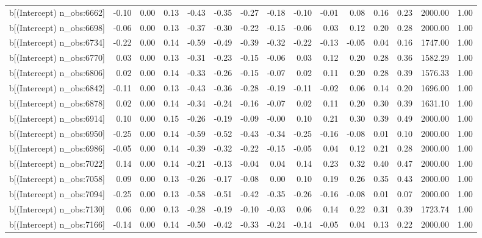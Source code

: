 \begin{table}[ht]
\begin{tabular}{rrrrrrrrrrrrrrr}
  b[(Intercept) n\_obs:6662] & -0.10 & 0.00 & 0.13 & -0.43 & -0.35 & -0.27 & -0.18 & -0.10 & -0.01 & 0.08 & 0.16 & 0.23 & 2000.00 & 1.00 \\ 
  b[(Intercept) n\_obs:6698] & -0.06 & 0.00 & 0.13 & -0.37 & -0.30 & -0.22 & -0.15 & -0.06 & 0.03 & 0.12 & 0.20 & 0.28 & 2000.00 & 1.00 \\ 
  b[(Intercept) n\_obs:6734] & -0.22 & 0.00 & 0.14 & -0.59 & -0.49 & -0.39 & -0.32 & -0.22 & -0.13 & -0.05 & 0.04 & 0.16 & 1747.00 & 1.00 \\ 
  b[(Intercept) n\_obs:6770] & 0.03 & 0.00 & 0.13 & -0.31 & -0.23 & -0.15 & -0.06 & 0.03 & 0.12 & 0.20 & 0.28 & 0.36 & 1582.29 & 1.00 \\ 
  b[(Intercept) n\_obs:6806] & 0.02 & 0.00 & 0.14 & -0.33 & -0.26 & -0.15 & -0.07 & 0.02 & 0.11 & 0.20 & 0.28 & 0.39 & 1576.33 & 1.00 \\ 
  b[(Intercept) n\_obs:6842] & -0.11 & 0.00 & 0.13 & -0.43 & -0.36 & -0.28 & -0.19 & -0.11 & -0.02 & 0.06 & 0.14 & 0.20 & 1696.00 & 1.00 \\ 
  b[(Intercept) n\_obs:6878] & 0.02 & 0.00 & 0.14 & -0.34 & -0.24 & -0.16 & -0.07 & 0.02 & 0.11 & 0.20 & 0.30 & 0.39 & 1631.10 & 1.00 \\ 
  b[(Intercept) n\_obs:6914] & 0.10 & 0.00 & 0.15 & -0.26 & -0.19 & -0.09 & -0.00 & 0.10 & 0.21 & 0.30 & 0.39 & 0.49 & 2000.00 & 1.00 \\ 
  b[(Intercept) n\_obs:6950] & -0.25 & 0.00 & 0.14 & -0.59 & -0.52 & -0.43 & -0.34 & -0.25 & -0.16 & -0.08 & 0.01 & 0.10 & 2000.00 & 1.00 \\ 
  b[(Intercept) n\_obs:6986] & -0.05 & 0.00 & 0.14 & -0.39 & -0.32 & -0.22 & -0.15 & -0.05 & 0.04 & 0.12 & 0.21 & 0.28 & 2000.00 & 1.00 \\ 
  b[(Intercept) n\_obs:7022] & 0.14 & 0.00 & 0.14 & -0.21 & -0.13 & -0.04 & 0.04 & 0.14 & 0.23 & 0.32 & 0.40 & 0.47 & 2000.00 & 1.00 \\ 
  b[(Intercept) n\_obs:7058] & 0.09 & 0.00 & 0.13 & -0.26 & -0.17 & -0.08 & 0.00 & 0.10 & 0.19 & 0.26 & 0.35 & 0.43 & 2000.00 & 1.00 \\ 
  b[(Intercept) n\_obs:7094] & -0.25 & 0.00 & 0.13 & -0.58 & -0.51 & -0.42 & -0.35 & -0.26 & -0.16 & -0.08 & 0.01 & 0.07 & 2000.00 & 1.00 \\ 
  b[(Intercept) n\_obs:7130] & 0.06 & 0.00 & 0.13 & -0.28 & -0.19 & -0.10 & -0.03 & 0.06 & 0.14 & 0.22 & 0.31 & 0.39 & 1723.74 & 1.00 \\ 
  b[(Intercept) n\_obs:7166] & -0.14 & 0.00 & 0.14 & -0.50 & -0.42 & -0.33 & -0.24 & -0.14 & -0.05 & 0.04 & 0.13 & 0.22 & 2000.00 & 1.00 \\ 

\end{tabular}
\end{table}
